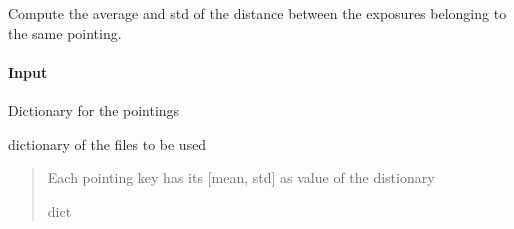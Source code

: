 \documentclass[letterpaper,10pt,english]{sphinxmanual}
\begin{document}
\begin{fulllineitems}
\label{\detokenize{api/pymusepipe:pymusepipe.util_image.compute_diagnostics}}
\pysigstartsignatures
{}
\pysigstopsignatures
\sphinxAtStartPar
Compute the average and std of the distance between the exposures belonging
to the same pointing.


\paragraph{Input}
\label{\detokenize{api/pymusepipe:id141}}\begin{description}
\sphinxAtStartPar
Dictionary for the pointings

\sphinxAtStartPar
dictionary of the files to be used

\end{description}
\begin{quote}\begin{description}
\sphinxAtStartPar
{} \textendash{} Each pointing key has its {[}mean, std{]} as value of the distionary

\sphinxAtStartPar
dict

\end{description}\end{quote}

\end{fulllineitems}

\end{document}
